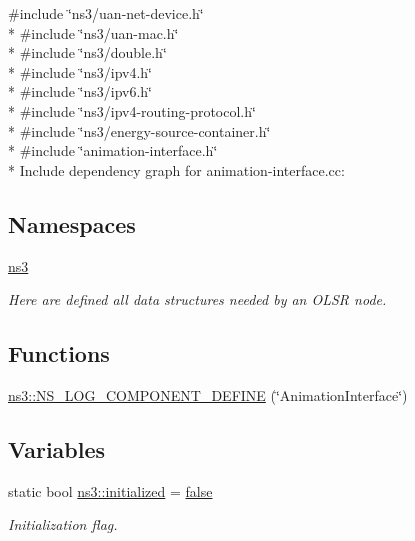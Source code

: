 {\ttfamily \#include \char`\"{}ns3/uan-\/net-\/device.\+h\char`\"{}}\\*
{\ttfamily \#include \char`\"{}ns3/uan-\/mac.\+h\char`\"{}}\\*
{\ttfamily \#include \char`\"{}ns3/double.\+h\char`\"{}}\\*
{\ttfamily \#include \char`\"{}ns3/ipv4.\+h\char`\"{}}\\*
{\ttfamily \#include \char`\"{}ns3/ipv6.\+h\char`\"{}}\\*
{\ttfamily \#include \char`\"{}ns3/ipv4-\/routing-\/protocol.\+h\char`\"{}}\\*
{\ttfamily \#include \char`\"{}ns3/energy-\/source-\/container.\+h\char`\"{}}\\*
{\ttfamily \#include \char`\"{}animation-\/interface.\+h\char`\"{}}\\*
Include dependency graph for animation-\/interface.cc\+:
\subsection*{Namespaces}
\begin{DoxyCompactItemize}
\item 
 \hyperlink{namespacens3}{ns3}
\begin{DoxyCompactList}\small\item\em Here are defined all data structures needed by an O\+L\+SR node. \end{DoxyCompactList}\end{DoxyCompactItemize}
\subsection*{Functions}
\begin{DoxyCompactItemize}
\item 
\hyperlink{namespacens3_acccd3d5ffcce405f4c9c8c6ae16a359f}{ns3\+::\+N\+S\+\_\+\+L\+O\+G\+\_\+\+C\+O\+M\+P\+O\+N\+E\+N\+T\+\_\+\+D\+E\+F\+I\+NE} (\char`\"{}Animation\+Interface\char`\"{})
\end{DoxyCompactItemize}
\subsection*{Variables}
\begin{DoxyCompactItemize}
\item 
static bool \hyperlink{namespacens3_a5b6a616937767dfa78aa50ac14be9bcc}{ns3\+::initialized} = \hyperlink{lte__cqi__generation_8m_ab1bef239d413c4da139c4bac92cd657a}{false}
\begin{DoxyCompactList}\small\item\em Initialization flag. \end{DoxyCompactList}\end{DoxyCompactItemize}
